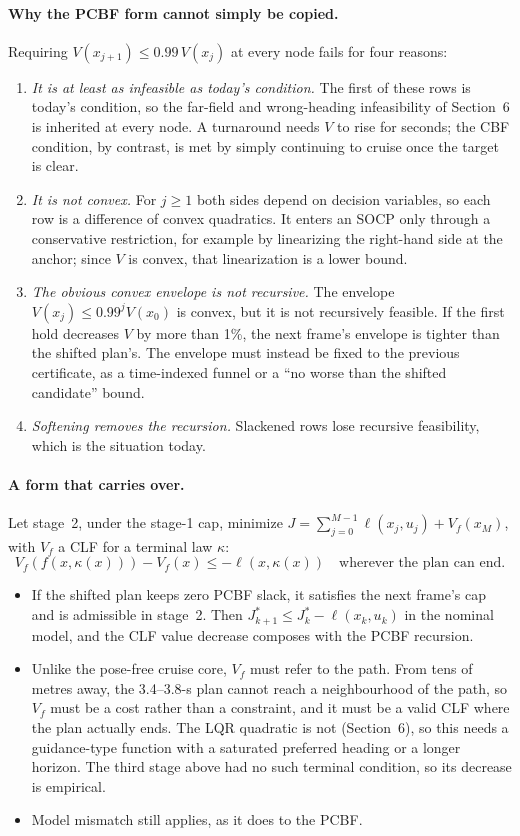 \documentclass[11pt]{article}
\begin{document}
\paragraph{Why the PCBF form cannot simply be copied.} Requiring
$V(x_{j+1})\le0.99\,V(x_j)$ at every node fails for four reasons:
\begin{enumerate}
\item \emph{It is at least as infeasible as today's condition.} The first of
these rows is today's condition, so the far-field and wrong-heading
infeasibility of Section~6 is inherited at every node. A turnaround needs $V$ to
rise for seconds; the CBF condition, by contrast, is met by simply continuing to
cruise once the target is clear.
\item \emph{It is not convex.} For $j\ge1$ both sides depend on decision
variables, so each row is a difference of convex quadratics. It enters an SOCP
only through a conservative restriction, for example by linearizing the
right-hand side at the anchor; since $V$ is convex, that linearization is a
lower bound.
\item \emph{The obvious convex envelope is not recursive.} The envelope
$V(x_j)\le0.99^jV(x_0)$ is convex, but it is not recursively feasible. If the
first hold decreases $V$ by more than 1\%, the next frame's envelope is tighter
than the shifted plan's. The envelope must instead be fixed to the previous
certificate, as a time-indexed funnel or a ``no worse than the shifted
candidate'' bound.
\item \emph{Softening removes the recursion.} Slackened rows lose recursive
feasibility, which is the situation today.
\end{enumerate}

\paragraph{A form that carries over.} Let stage~2, under the stage-1 cap,
minimize $J=\sum_{j=0}^{M-1}\ell(x_j,u_j)+V_f(x_M)$, with $V_f$ a CLF for a
terminal law $\kappa$:
\[
V_f(f(x,\kappa(x)))-V_f(x)\le-\ell(x,\kappa(x))
\quad\text{wherever the plan can end.}
\]
\begin{itemize}
\item If the shifted plan keeps zero PCBF slack, it satisfies the next frame's
cap and is admissible in stage~2. Then $J^*_{k+1}\le J^*_k-\ell(x_k,u_k)$ in the
nominal model, and the CLF value decrease composes with the PCBF
recursion.
\item Unlike the pose-free cruise core, $V_f$ must refer to the path. From tens
of metres away, the 3.4--3.8-s plan cannot reach a neighbourhood of the path, so
$V_f$ must be a cost rather than a constraint, and it must be a valid CLF where
the plan actually ends. The LQR quadratic is not (Section~6), so this needs a
guidance-type function with a saturated preferred heading or a longer horizon.
The third stage above had no such terminal condition, so its decrease is
empirical.
\item Model mismatch still applies, as it does to the PCBF.
\end{itemize}
\end{document}

